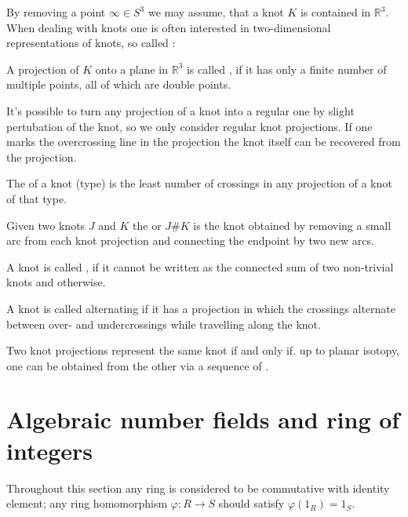 By removing a point $\infty \in S^3$ we may assume, that a knot $K$ is contained in $\mathbb{R}^3$.
When dealing with knots one is often interested in two-dimensional representations of knots, so called :

\begin{definition}
	A projection of $K$ onto a plane in $\mathbb{R}^3$ is called , if it has only a finite number of multiple points, all of which are double points.
\end{definition}

It's possible to turn any projection of a knot into a regular one by slight pertubation of the knot, so we only consider regular knot projections.
If one marks the overcrossing line in the projection the knot itself can be recovered from the projection.

\begin{definition}[{name=[crossing number]}]
	The  of a knot (type) is the least number of crossings in any projection of a knot of that type.
\end{definition}

\begin{definition}
	Given two knots $J$ and $K$ the  or  $J\#K$ is the knot obtained by removing a small arc from each knot projection and connecting the endpoint by two new arcs.

	A knot is called , if it cannot be written as the connected sum of two non-trivial knots and  otherwise.
\end{definition}


\begin{definition}
	A knot is called alternating if it has a projection in which the crossings alternate between over- and undercrossings while travelling along the knot.
\end{definition}

\begin{lemma}
	Two knot projections represent the same knot if and only if. up to planar isotopy, one can be obtained from the other via a sequence of .
\end{lemma}




\section{Algebraic number fields and ring of integers} %
\label{sec:rings_and_ideals}
Throughout this section any ring is considered to be commutative with identity element; any ring homomorphism $\varphi \colon R \to S$ should satisfy $\varphi(1_R) =1_S$.

